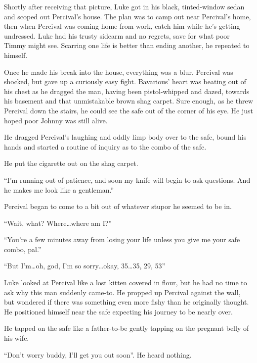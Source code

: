 Shortly after receiving that picture, Luke got in his black,
tinted-window sedan and scoped out Percival's house. The plan
was to camp out near Percival's home, then when Percival was
coming home from work, catch him while he's getting
undressed. Luke had his trusty sidearm and no regrets, save for
what poor Timmy might see. Scarring one life is better than ending
another, he repeated to himself.



Once he made his break into the house, everything was a blur.
Percival was shocked, but gave up a curiously easy fight.
Bavarious' heart was beating out of his chest as he dragged
the man, having been pistol-whipped and dazed, towards his basement
and that unmistakable brown shag carpet. Sure enough, as he threw
Percival down the stairs, he could see the safe out of the corner
of his eye. He just hoped poor Johnny was still alive.



He dragged Percival's laughing and oddly limp body over to
the safe, bound his hands and started a routine of inquiry as to
the combo of the safe.



He put the cigarette out on the shag carpet.



``I'm running out of patience, and soon my knife will
begin to ask questions. And he makes me look like a
gentleman.''

Percival began to come to a bit out of whatever stupor he seemed to
be in.

``Wait, what? Where{\ldots}where am I?''

``You're a few minutes away from losing your life unless
you give me your safe combo, pal.''

``But I'm{\ldots}oh, god, I'm so
sorry{\ldots}okay, 35{\ldots}35, 29, 53''



Luke looked at Percival like a lost kitten covered in flour, but he
had no time to ask why this man suddenly came-to. He propped up
Percival against the wall, but wondered if there was something even
more fishy than he originally thought. He positioned himself near
the safe expecting his journey to be nearly over.



He tapped on the safe like a father-to-be gently tapping on the
pregnant belly of his wife.

``Don't worry buddy, I'll get you out soon''.
He heard nothing.

